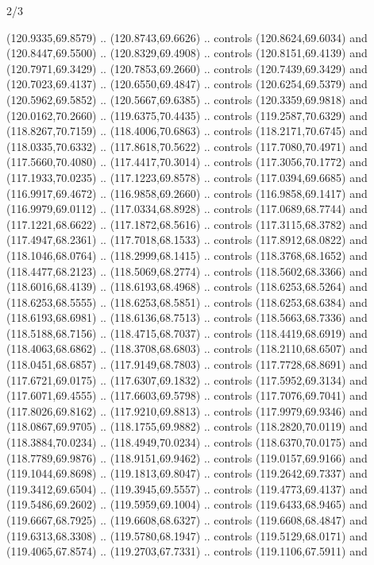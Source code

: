 \begin{flagdescription}{2/3}
\begin{scope}[shift={(0.5\flaglength,0.5)},scale=\flagwidth/320]
\begin{scope}[y=0.8pt, x=0.8pt, yscale=-1,shift={(-118.3,-146)}]
  (120.9335,69.8579) .. (120.8743,69.6626) .. controls (120.8624,69.6034) and
  (120.8447,69.5500) .. (120.8329,69.4908) .. controls (120.8151,69.4139) and
  (120.7971,69.3429) .. (120.7853,69.2660) .. controls (120.7439,69.3429) and
  (120.7023,69.4137) .. (120.6550,69.4847) .. controls (120.6254,69.5379) and
  (120.5962,69.5852) .. (120.5667,69.6385) .. controls (120.3359,69.9818) and
  (120.0162,70.2660) .. (119.6375,70.4435) .. controls (119.2587,70.6329) and
  (118.8267,70.7159) .. (118.4006,70.6863) .. controls (118.2171,70.6745) and
  (118.0335,70.6332) .. (117.8618,70.5622) .. controls (117.7080,70.4971) and
  (117.5660,70.4080) .. (117.4417,70.3014) .. controls (117.3056,70.1772) and
  (117.1933,70.0235) .. (117.1223,69.8578) .. controls (117.0394,69.6685) and
  (116.9917,69.4672) .. (116.9858,69.2660) .. controls (116.9858,69.1417) and
  (116.9979,69.0112) .. (117.0334,68.8928) .. controls (117.0689,68.7744) and
  (117.1221,68.6622) .. (117.1872,68.5616) .. controls (117.3115,68.3782) and
  (117.4947,68.2361) .. (117.7018,68.1533) .. controls (117.8912,68.0822) and
  (118.1046,68.0764) .. (118.2999,68.1415) .. controls (118.3768,68.1652) and
  (118.4477,68.2123) .. (118.5069,68.2774) .. controls (118.5602,68.3366) and
  (118.6016,68.4139) .. (118.6193,68.4968) .. controls (118.6253,68.5264) and
  (118.6253,68.5555) .. (118.6253,68.5851) .. controls (118.6253,68.6384) and
  (118.6193,68.6981) .. (118.6136,68.7513) .. controls (118.5663,68.7336) and
  (118.5188,68.7156) .. (118.4715,68.7037) .. controls (118.4419,68.6919) and
  (118.4063,68.6862) .. (118.3708,68.6803) .. controls (118.2110,68.6507) and
  (118.0451,68.6857) .. (117.9149,68.7803) .. controls (117.7728,68.8691) and
  (117.6721,69.0175) .. (117.6307,69.1832) .. controls (117.5952,69.3134) and
  (117.6071,69.4555) .. (117.6603,69.5798) .. controls (117.7076,69.7041) and
  (117.8026,69.8162) .. (117.9210,69.8813) .. controls (117.9979,69.9346) and
  (118.0867,69.9705) .. (118.1755,69.9882) .. controls (118.2820,70.0119) and
  (118.3884,70.0234) .. (118.4949,70.0234) .. controls (118.6370,70.0175) and
  (118.7789,69.9876) .. (118.9151,69.9462) .. controls (119.0157,69.9166) and
  (119.1044,69.8698) .. (119.1813,69.8047) .. controls (119.2642,69.7337) and
  (119.3412,69.6504) .. (119.3945,69.5557) .. controls (119.4773,69.4137) and
  (119.5486,69.2602) .. (119.5959,69.1004) .. controls (119.6433,68.9465) and
  (119.6667,68.7925) .. (119.6608,68.6327) .. controls (119.6608,68.4847) and
  (119.6313,68.3308) .. (119.5780,68.1947) .. controls (119.5129,68.0171) and
  (119.4065,67.8574) .. (119.2703,67.7331) .. controls (119.1106,67.5911) and

\end{scope}
\end{scope}
\end{flagdescription}

